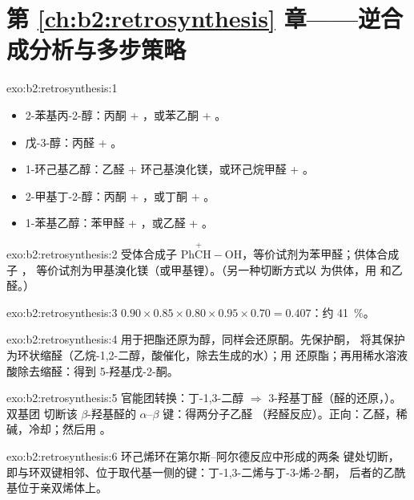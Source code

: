 \section*{第 \ref{ch:b2:retrosynthesis} 章——逆合成分析与多步策略}

\begin{solution}{exo:b2:retrosynthesis:1}
\begin{itemize}
  \item 2-苯基丙-2-醇：丙酮 + ，或苯乙酮 + 。
  \item 戊-3-醇：丙醛 + 。
  \item 1-环己基乙醇：乙醛 + 环己基溴化镁，或环己烷甲醛 +
        。
  \item 2-甲基丁-2-醇：丙酮 + ，或丁酮 + 。
  \item 1-苯基乙醇：苯甲醛 + ，或乙醛 + 。
\end{itemize}
\end{solution}

\begin{solution}{exo:b2:retrosynthesis:2}
受体合成子 $\mathrm{Ph\overset{+}{C}H{-}OH}$，等价试剂为苯甲醛；供体合成子 ，
等价试剂为甲基溴化镁（或甲基锂）。（另一种切断方式以  为供体，用
 和乙醛。）
\end{solution}

\begin{solution}{exo:b2:retrosynthesis:3}
$0.90 \times 0.85 \times 0.80 \times 0.95 \times 0.70 = 0.407$：约 41~\%。
\end{solution}

\begin{solution}{exo:b2:retrosynthesis:4}
 用于把酯还原为醇，同样会还原酮。先保护酮，
将其保护为环状缩醛（乙烷-1,2-二醇，酸催化，除去生成的水）；用
 还原酯；再用稀水溶液酸除去缩醛：得到 5-羟基戊-2-酮。
\end{solution}

\begin{solution}{exo:b2:retrosynthesis:5}
官能团转换：丁-1,3-二醇 $\Rightarrow$ 3-羟基丁醛（醛的还原，）。双基团
切断该 $\beta$-羟基醛的 $\alpha$--$\beta$ 键：得两分子乙醛
（羟醛反应）。正向：乙醛，稀碱，冷却；然后用 。
\end{solution}

\begin{solution}{exo:b2:retrosynthesis:6}
环己烯环在第尔斯–阿尔德反应中形成的两条  键处切断，
即与环双键相邻、位于取代基一侧的键：丁-1,3-二烯与丁-3-烯-2-酮，
后者的乙酰基位于亲双烯体上。
\end{solution}


